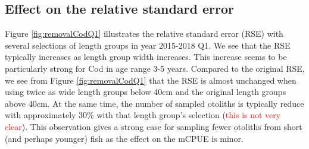 \documentclass[a4paper 12pt]{article}
\numberwithin{equation}{section}
\newcommand{\ed}[1]{\textcolor{red}{#1}}
\begin{document}
\subsection{Effect on the relative standard error}
Figure \ref{fig:removalCodQ1} illustrates the relative standard error (RSE) with several selections of length groups in year 2015-2018 Q1.  We see that the RSE typically increases as length group width increases. This increase seems to be particularly strong for Cod in age range 3-5 years. Compared to the original RSE, we see from Figure \ref{fig:removalCodQ1} that the RSE is almost unchanged when using twice as wide length groups below 40cm and the original length groups above 40cm.  At the same time, the number of sampled otoliths is typically reduce with approximately 30\% with that length group's selection (\ed{this is not very clear}). This observation gives a strong case for sampling fewer otoliths from short (and perhaps younger) fish as the effect on the mCPUE is minor. %
\end{document}
